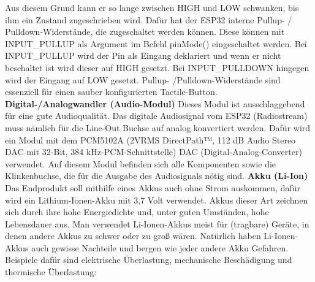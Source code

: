 \documentclass[11pt, twoside]{article}
\begin{document}
Aus diesem Grund kann er so lange zwischen HIGH und LOW schwanken, bis ihm ein Zustand zugeschrieben wird. Dafür hat der ESP32 interne Pullup- / Pulldown-Widerstände, die zugeschaltet werden können. Diese können mit INPUT\_PULLUP als Argument im Befehl pinMode() eingeschaltet werden.
Bei INPUT\_PULLUP wird der Pin als Eingang deklariert und wenn er nicht beschaltet ist wird dieser auf HIGH gesetzt.
Bei INPUT\_PULLDOWN hingegen wird der Eingang auf LOW gesetzt.\grqq{} \parencite{noauthor_urlnl08_nodate} \newline
Pullup- /Pulldown-Widerstände sind essenziell für einen sauber konfigurierten Tactile-Button.\newline
\parencite[vgl.][]{noauthor_urlnl06_nodate}
\vspace{4mm}\newline
\textbf{Digital-/Analogwandler (Audio-Modul)}\newline
Dieses Modul ist ausschlaggebend für eine gute Audioqualität. Das digitale Audiosignal vom ESP32 (Radiostream) muss nämlich für die Line-Out Buchse auf analog konvertiert werden. Dafür wird ein Modul mit dem PCM5102A (\glqq 2VRMS DirectPath™, 112 dB Audio Stereo DAC mit 32-Bit, 384 kHz-PCM-Schnittstelle\grqq{}) DAC (Digital-Analog-Converter) verwendet. Auf diesem Modul befinden sich alle Komponenten sowie die Klinkenbuchse, die für die Ausgabe des Audiosignals nötig sind. \parencite[vgl.][]{noauthor_urlnl09_nodate}
\vspace{4mm}\newline
\textbf{Akku (Li-Ion)}\newline
Das Endprodukt soll mithilfe eines Akkus auch ohne Strom auskommen, dafür wird ein Lithium-Ionen-Akku mit 3,7 Volt verwendet. Akkus dieser Art zeichnen sich durch ihre hohe Energiedichte und, unter guten Umständen, hohe Lebensdauer aus. Man verwendet Li-Ionen-Akkus meist für (tragbare) Geräte, in denen andere Akkus zu schwer oder zu groß wären. \parencite[vgl.][]{noauthor_urlnl10_nodate} \vspace{4mm}\newline
Natürlich haben Li-Ionen-Akkus auch gewisse Nachteile und bergen wie jeder andere Akku Gefahren. Beispiele dafür sind elektrische Überlastung, mechanische Beschädigung und thermische Überlastung:
\end{document}

